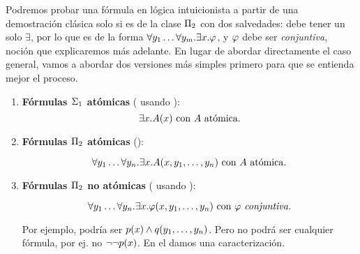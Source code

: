 Podremos probar una fórmula en lógica intuicionista a partir de una demostración clásica solo si es de la clase $\Pi_{2}$ con dos salvedades: debe tener un solo $\exists$, por lo que es de la forma $\forall y_1 \dots \forall y_m . \exists x . \varphi$, y $\varphi$ debe ser \textit{conjuntiva}, noción que explicaremos más adelante. En lugar de abordar directamente el caso general, vamos a abordar dos versiones más simples primero para que se entienda mejor el proceso.

\begin{enumerate}
    \item \textbf{Fórmulas $\Sigma_{1}$ atómicas} ( usando ):
          \[
              \exists x . A(x) \text{ con } A \text{ atómica.}
          \]
    \item \textbf{Fórmulas $\Pi_{2}$ atómicas} ():

          \[
              \forall y_1 \dots \forall y_n . \exists x . A(x, y_1, \dots, y_n) \text{ con } A \text{ atómica}.
          \]

    \item \textbf{Fórmulas $\Pi_{2}$ no atómicas} ( usando ):

          \[
              \forall y_1 \dots \forall y_n . \exists x . \varphi(x, y_1, \dots, y_n) \text{ con } \varphi \text{\textit{ conjuntiva}}.
          \]

          Por ejemplo, podría ser $p(x) \wedge q(y_1, \dots, y_n)$.
          Pero no podrá ser cualquier fórmula, por ej. no $\neg \neg p(x)$. En el  damos una caracterización.
\end{enumerate}


